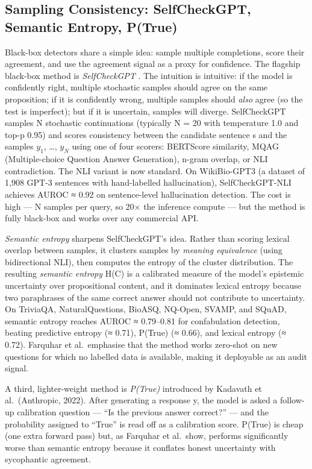\documentclass{article}
\begin{document}
\subsection{Sampling Consistency: SelfCheckGPT, Semantic Entropy, P(True)}\label{sampling-consistency-selfcheckgpt-semantic-entropy-ptrue}

Black-box detectors share a simple idea: sample multiple completions, score their agreement, and use the agreement signal as a proxy for confidence. The flagship black-box method is \emph{SelfCheckGPT} \citep{manakul2023selfcheckgptzerore}. The intuition is intuitive: if the model is confidently right, multiple stochastic samples should agree on the same proposition; if it is confidently wrong, multiple samples should \emph{also} agree (so the test is imperfect); but if it is uncertain, samples will diverge. SelfCheckGPT samples N stochastic continuations (typically N = 20 with temperature 1.0 and top-p 0.95) and scores consistency between the candidate sentence s and the samples \(y_1\), \ldots, \(y_N\) using one of four scorers: BERTScore similarity, MQAG (Multiple-choice Question Answer Generation), n-gram overlap, or NLI contradiction. The NLI variant is now standard. On WikiBio-GPT3 (a dataset of 1,908 GPT-3 sentences with hand-labelled hallucination), SelfCheckGPT-NLI achieves AUROC ≈ 0.92 on sentence-level hallucination detection. The cost is high --- N samples per query, so 20× the inference compute --- but the method is fully black-box and works over any commercial API.

\emph{Semantic entropy} \citep{farquhar2024detectinghallucina} sharpens SelfCheckGPT's idea. Rather than scoring lexical overlap between samples, it clusters samples by \emph{meaning equivalence} (using bidirectional NLI), then computes the entropy of the cluster distribution. The resulting \emph{semantic entropy} H(C) is a calibrated measure of the model's epistemic uncertainty over propositional content, and it dominates lexical entropy because two paraphrases of the same correct answer should not contribute to uncertainty. On TriviaQA, NaturalQuestions, BioASQ, NQ-Open, SVAMP, and SQuAD, semantic entropy reaches AUROC ≈ 0.79--0.81 for confabulation detection, beating predictive entropy (≈ 0.71), P(True) (≈ 0.66), and lexical entropy (≈ 0.72). Farquhar et al.~emphasise that the method works zero-shot on new questions for which no labelled data is available, making it deployable as an audit signal.

A third, lighter-weight method is \emph{P(True)} introduced by Kadavath et al.~(Anthropic, 2022). After generating a response y, the model is asked a follow-up calibration question --- ``Is the previous answer correct?'' --- and the probability assigned to ``True'' is read off as a calibration score. P(True) is cheap (one extra forward pass) but, as Farquhar et al.~show, performs significantly worse than semantic entropy because it conflates honest uncertainty with sycophantic agreement.
\end{document}
